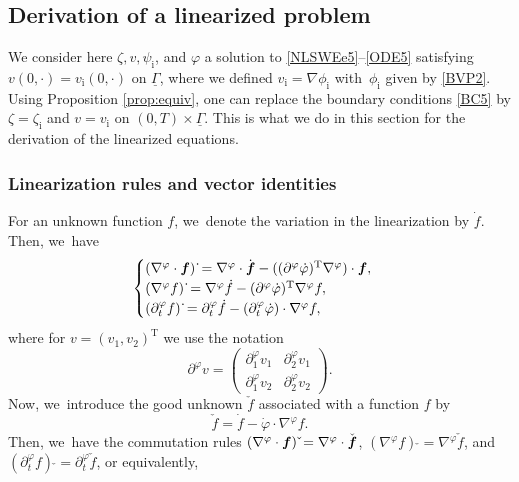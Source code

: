\documentclass[11pt]{article}
\newcommand{\dt}{\partial_t}
\newcommand{\ul}[1]{\underline{#1}}
\newcommand{\itGamma}{\mathit{\Gamma}}
\theoremstyle{definition}
\begin{document}
\subsection{Derivation of a linearized problem}\label{subsect:DLP}
We consider here $\zeta,v,\psi_\mathrm{i}$, and $\varphi$ a solution to \eqref{NLSWEe5}--\eqref{ODE5} satisfying $v(0,\cdot)=v_\mathrm{i}(0,\cdot)$ on $\ul{\itGamma}$,
where we defined $v_\mathrm{i}=\nabla \phi_\mathrm{i}$ with~$\phi_\mathrm{i}$ given by \eqref{BVP2}.
Using Proposition \ref{prop:equiv}, one can replace the boundary conditions \eqref{BC5} by $\zeta=\zeta_\mathrm{i}$ and $v=v_\mathrm{i}$ on $(0,T)\times\ul{\itGamma}$.
This is what we do in this section for the derivation of the linearized equations.

\subsubsection{Linearization rules and vector identities}
For an unknown function $f$, we~denote the variation in the linearization by $\dot{f}$.
Then, we~have
\begin{equation}\label{linearization 1}
\begin{cases}
(\nabla^\varphi \cdot \mbox{\boldmath$f$})\,\dot{}
= \nabla^\varphi \cdot \dot{\mbox{\boldmath$f$}}
- ((\partial^\varphi \dot{\varphi})^\mathrm{T}\nabla^\varphi) \cdot \mbox{\boldmath$f$}, \\
(\nabla^\varphi f)\,\dot{}
= \nabla^\varphi \dot{f} - (\partial^\varphi \dot{\varphi})^\mathrm{T}\nabla^\varphi f, \\
(\dt^\varphi f)\,\dot{}
= \dt^\varphi\dot{f} - (\dt^\varphi\dot{\varphi}) \cdot \nabla^\varphi f,
\end{cases}
\end{equation}
where for $v = (v_1,v_2)^\mathrm{T}$ we use the notation
\[
\partial^\varphi v =
\begin{pmatrix}
\partial_1^\varphi v_1 & \partial_2^\varphi v_1 \\
\partial_1^\varphi v_2 & \partial_2^\varphi v_2
\end{pmatrix}.
\]
Now, we~introduce the good unknown $\check{f}$ associated with a function $f$ by
\begin{equation}\label{GoodUnknown}
\check{f} = \dot{f} - \dot{\varphi} \cdot \nabla^\varphi f.
\end{equation}
Then, we~have the commutation rules $(\nabla^\varphi\cdot \mbox{\boldmath$f$})\,\check{} =\nabla^\varphi\cdot \check{\mbox{\boldmath$f$}}$,
$(\nabla^\varphi f)\,\check{} =\nabla^\varphi \check{f}$, and $(\dt^\varphi f)\,\check{} =\dt^\varphi \check{f}$, or equivalently,
\end{document}
